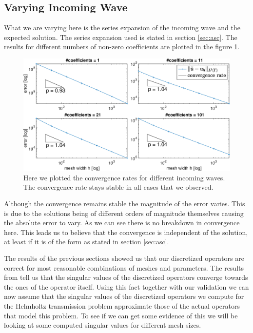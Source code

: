 \documentclass[a4paper, oneside]{discothesis}
\begin{document}
\subsection{Varying Incoming Wave}
What we are varying here is the series expansion of the incoming wave and the expected solution.
The series expansion used is stated in section \ref{sec:asc}.
The results for different numbers of non-zero coefficients are plotted in the figure \ref{fig:solutions}.
\begin{figure} [!ht]
	\centering
	\includegraphics[width=\columnwidth]{figures/solutions.eps}
	\caption{ Here we plotted the convergence rates for different incoming waves.
	The convergence rate stays stable in all cases that we observed.}
	\label{fig:solutions}
\end{figure}
Although the convergence remains stable the magnitude of the error varies.
This is due to the solutions being of different orders of magnitude themselves causing the absolute error to vary.
As we can see there is no breakdown in convergence here.
This leads us to believe that the convergence is independent of the solution, at least if it is of the form as stated in section \ref{sec:asc}.

The results of the previous sections showed us that our discretized operators are correct for most reasonable combinations of meshes and parameters.
The results from \cite{svdap} tell us that the singular values of the discretized operators converge towards the ones of the operator itself.
Using this fact together with our validation we can now assume that the singular values of the discretized operators we compute for the Helmholtz transmission problem approximate those of the actual operators that model this problem.
To see if we can get some evidence of this we will be looking at some computed singular values for different mesh sizes.
\end{document}
